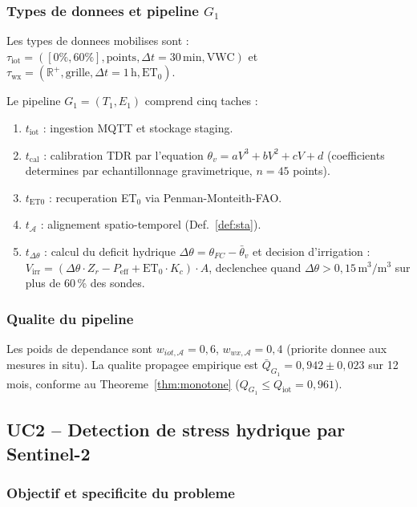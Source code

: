 \documentclass[12pt,a4paper]{article}
\theoremstyle{plain}
\theoremstyle{definition}
\theoremstyle{remark}
\newcommand{\R}{\mathbb{R}}
\begin{document}
\subsubsection{Types de donnees et pipeline $G_1$}

Les types de donnees mobilises sont :
$\tau_{\text{iot}} = ([0\%,60\%], \text{points}, \Delta t=30\,\text{min}, \text{VWC})$
et
$\tau_{\text{wx}} = (\R^+, \text{grille}, \Delta t=1\,\text{h}, \text{ET}_0)$.

Le pipeline $G_1 = (T_1, E_1)$ comprend cinq taches :

\begin{enumerate}[leftmargin=1.5em,noitemsep]
  \item $t_{\text{iot}}$ : ingestion MQTT et stockage staging.
  \item $t_{\text{cal}}$ : calibration TDR par l'equation
    $\theta_v = aV^3 + bV^2 + cV + d$ (coefficients determines par
    echantillonnage gravimetrique, $n=45$ points).
  \item $t_{\text{ET0}}$ : recuperation ET$_0$ via Penman-Monteith-FAO.
  \item $t_{\mathcal{A}}$ : alignement spatio-temporel (Def.~\ref{def:sta}).
  \item $t_{\Delta\theta}$ : calcul du deficit hydrique
    $\Delta\theta = \theta_{FC} - \bar\theta_v$ et decision
    d'irrigation :
    $V_{\text{irr}} = (\Delta\theta \cdot Z_r - P_{\text{eff}} +
    \text{ET}_0 \cdot K_c) \cdot A$,
    declenchee quand $\Delta\theta > 0{,}15\,\text{m}^3/\text{m}^3$
    sur plus de 60\,\% des sondes.
\end{enumerate}

\subsubsection{Qualite du pipeline}

Les poids de dependance sont $w_{iot,\mathcal{A}}=0{,}6$,
$w_{wx,\mathcal{A}}=0{,}4$ (priorite donnee aux mesures in situ).
La qualite propagee empirique est
$\bar Q_{G_1} = 0{,}942 \pm 0{,}023$ sur 12 mois, conforme au
Theoreme~\ref{thm:monotone} ($Q_{G_1} \leq Q_{\text{iot}} = 0{,}961$).

\subsection{UC2 -- Detection de stress hydrique par Sentinel-2}
\label{subsec:uc2}

\subsubsection{Objectif et specificite du probleme}
\end{document}
